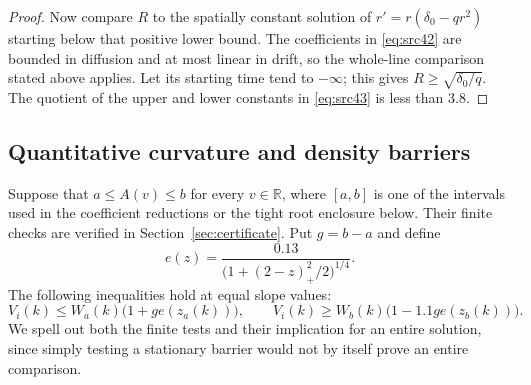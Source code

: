 \documentclass[11pt,a4paper]{article}
\numberwithin{equation}{section}
\theoremstyle{definition}
\theoremstyle{remark}
\newcommand{\R}{\mathbb R}
\begin{document}
\begin{proof}
Now compare $R$ to the spatially constant solution of
$r'=r(\delta_0-qr^2)$ starting below that positive lower bound.
The coefficients in \eqref{eq:src42} are bounded in diffusion and
at most linear in drift, so the whole-line comparison stated above
applies.  Let its starting time tend to $-\infty$; this gives
$R\ge\sqrt{\delta_0/q}$.  The quotient of the upper and lower
constants in \eqref{eq:src43} is less than $3.8$.
\end{proof}

\subsection{Quantitative curvature and density barriers}

Suppose that $a\le A(v)\le b$ for every $v\in\R$, where $[a,b]$
is one of the intervals used in the coefficient reductions or the
tight root enclosure below.  Their finite checks are verified in
Section~\ref{sec:certificate}.  Put $g=b-a$ and define
\[
 e(z)=\frac{0.13}{\bigl(1+(2-z)_+^2/2\bigr)^{1/4}}.
\]
The following inequalities hold at equal slope values:
\begin{equation}
 V_i(k)\le W_a(k)\bigl(1+ge(z_a(k))\bigr),\qquad
 V_i(k)\ge W_b(k)\bigl(1-1.1ge(z_b(k))\bigr).
 \label{eq:src44}
\end{equation}
We spell out both the finite tests and their implication for an entire
solution, since simply testing a stationary barrier would not by
itself prove an entire comparison.
\end{document}
